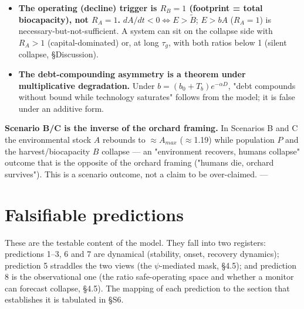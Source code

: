 \documentclass[11pt]{article}
\begin{document}
\begin{itemize}
\item \textbf{The operating (decline) trigger is $R_{B} = 1$ (footprint = total biocapacity), not $R_{A} = 1$.} $dA/dt < 0 \iff{} E > \tilde{B}$; $E > bA$ ($R_{A} = 1$) is necessary-but-not-sufficient. A system can sit on the collapse side with $R_{A} > 1$ (capital-dominated) or, at long $\tau{}_{g}$, with both ratios below 1 (silent collapse, §Discussion).
\item \textbf{The debt-compounding asymmetry is a theorem under multiplicative degradation.} Under $b = (b_{0}+T_{b})e^{-\alpha{}D}$, "debt compounds without bound while technology saturates" follows from the model; it is false under an additive form.
\end{itemize}

\textbf{Scenario B/C is the inverse of the orchard framing.} In Scenarios B and C the environmental stock $A$ rebounds to \ensuremath{\approx{}}$A_{max}$ (\ensuremath{\approx{}}1.19) while population $P$ and the harvest/biocapacity $B$ collapse — an "environment recovers, humans collapse" outcome that is the opposite of the orchard framing ("humans die, orchard survives"). This is a scenario outcome, not a claim to be over-claimed. ---

\section{Falsifiable predictions}

These are the testable content of the model. They fall into two registers: predictions 1–3, 6 and 7 are dynamical (stability, onset, recovery dynamics); prediction 5 straddles the two views (the \ensuremath{\psi{}}-mediated mask, §4.5); and prediction 8 is the observational one (the ratio safe-operating space and whether a monitor can forecast collapse, §4.5). The mapping of each prediction to the section that establishes it is tabulated in §S6.
\end{document}
